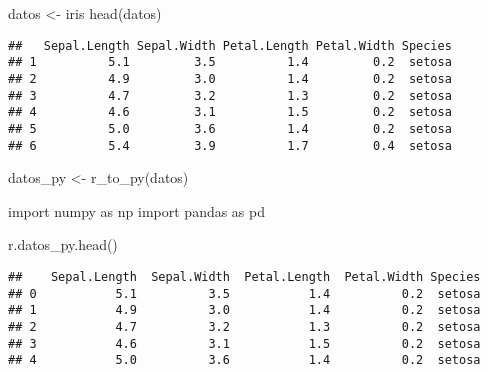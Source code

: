 \documentclass[
]{article}
\newenvironment{Shaded}{\begin{snugshade}}{\end{snugshade}}
\newcommand{\FunctionTok}[1]{\textcolor[rgb]{0.00,0.00,0.00}{#1}}
\newcommand{\ImportTok}[1]{#1}
\newcommand{\NormalTok}[1]{#1}
\newcommand{\OtherTok}[1]{\textcolor[rgb]{0.56,0.35,0.01}{#1}}
\begin{document}
\begin{Shaded}
\begin{Highlighting}[]
\NormalTok{datos }\OtherTok{\textless{}{-}}\NormalTok{ iris}
\FunctionTok{head}\NormalTok{(datos)}
\end{Highlighting}
\end{Shaded}

\begin{verbatim}
##   Sepal.Length Sepal.Width Petal.Length Petal.Width Species
## 1          5.1         3.5          1.4         0.2  setosa
## 2          4.9         3.0          1.4         0.2  setosa
## 3          4.7         3.2          1.3         0.2  setosa
## 4          4.6         3.1          1.5         0.2  setosa
## 5          5.0         3.6          1.4         0.2  setosa
## 6          5.4         3.9          1.7         0.4  setosa
\end{verbatim}

\begin{Shaded}
\begin{Highlighting}[]
\NormalTok{datos\_py }\OtherTok{\textless{}{-}} \FunctionTok{r\_to\_py}\NormalTok{(datos)}
\end{Highlighting}
\end{Shaded}

\begin{Shaded}
\begin{Highlighting}[]
\ImportTok{import}\NormalTok{ numpy }\ImportTok{as}\NormalTok{ np}
\ImportTok{import}\NormalTok{ pandas }\ImportTok{as}\NormalTok{ pd}

\NormalTok{r.datos\_py.head()}
\end{Highlighting}
\end{Shaded}

\begin{verbatim}
##    Sepal.Length  Sepal.Width  Petal.Length  Petal.Width Species
## 0           5.1          3.5           1.4          0.2  setosa
## 1           4.9          3.0           1.4          0.2  setosa
## 2           4.7          3.2           1.3          0.2  setosa
## 3           4.6          3.1           1.5          0.2  setosa
## 4           5.0          3.6           1.4          0.2  setosa
\end{verbatim}
\end{document}
